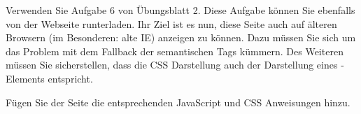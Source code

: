 %
\par Verwenden Sie Aufgabe 6 von Übungsblatt 2. Diese Aufgabe können Sie
ebenfalls von der Webseite runterladen. Ihr Ziel ist es nun, diese Seite auch
auf älteren Browsern (im Besonderen: alte IE) anzeigen zu können. Dazu müssen
Sie sich um das Problem mit dem Fallback der semantischen Tags kümmern. Des
Weiteren müssen Sie sicherstellen, dass die CSS Darstellung auch der
Darstellung eines -Elements entspricht.
%
\par Fügen Sie der Seite die entsprechenden JavaScript und CSS Anweisungen
hinzu.